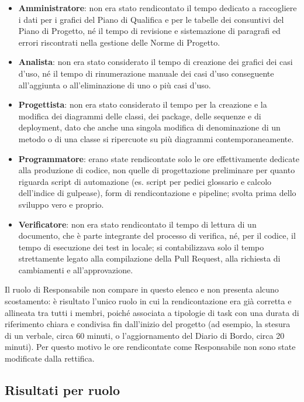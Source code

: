 \begin{itemize}
    \item \textbf{Amministratore}: non era stato rendicontato il tempo dedicato a 
    raccogliere i dati per i grafici del Piano di Qualifica e per
    le tabelle dei consuntivi del Piano di Progetto, né il tempo di
    revisione e sistemazione di paragrafi ed errori riscontrati nella
    gestione delle Norme di Progetto.
    \item \textbf{Analista}: non era stato considerato il tempo di creazione dei
    grafici dei casi d'uso, né il tempo di rinumerazione manuale dei casi
    d'uso conseguente all'aggiunta o all'eliminazione di uno o più casi
    d'uso.
    \item \textbf{Progettista}: non era stato considerato il tempo per la
    creazione e la modifica dei diagrammi delle classi, dei package, delle
    sequenze e di deployment, dato che anche una singola modifica di
    denominazione di un metodo o di una classe si ripercuote su più
    diagrammi contemporaneamente.
    \item \textbf{Programmatore}: erano state rendicontate solo le ore
    effettivamente dedicate alla produzione di codice, non quelle di
    progettazione preliminare per quanto riguarda script di automazione (es. script per pedici 
    glossario e calcolo dell'indice di gulpease), form di rendicontazione e pipeline;
     svolta prima dello sviluppo vero e proprio.
    \item \textbf{Verificatore}: non era stato rendicontato il tempo di lettura
    di un documento, che è parte integrante del processo di verifica, né,
    per il codice, il tempo di esecuzione dei test in locale; si
    contabilizzava solo il tempo strettamente legato alla compilazione
    della Pull Request, alla richiesta di cambiamenti e all'approvazione.
\end{itemize}

Il ruolo di Responsabile non compare in questo elenco e non presenta
alcuno scostamento: è risultato l'unico ruolo in cui la rendicontazione
era già corretta e allineata tra tutti i membri, poiché associata a
tipologie di task con una durata di riferimento chiara e condivisa fin
dall'inizio del progetto (ad esempio, la stesura di un verbale, circa 60
minuti, o l'aggiornamento del Diario di Bordo, circa 20 minuti). Per
questo motivo le ore rendicontate come Responsabile non sono state
modificate dalla rettifica.

\subsection{Risultati per ruolo}

